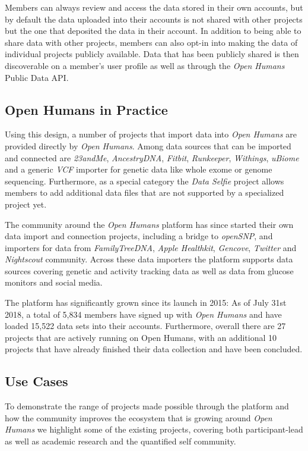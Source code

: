 \documentclass[a4paper,num-refs]{oup-contemporary}
\begin{document}
Members can always review and access the data stored in their own accounts, but by default the data uploaded into their accounts is not shared with other projects but the one that deposited the data in their account. In addition to being able to share data with other projects, members can also opt-in into making the data of individual projects publicly available. Data that has been publicly shared is then discoverable on a member's user profile as well as through the \textit{Open Humans} Public Data API. 

\subsection{Open Humans in Practice}
Using this design, a number of projects that import data into \textit{Open Humans} are provided directly by \textit{Open Humans}. Among data sources that can be imported and connected are \textit{23andMe}, \textit{AncestryDNA}, \textit{Fitbit}, \textit{Runkeeper}, \textit{Withings}, \textit{uBiome} and a generic \textit{VCF} importer for genetic data like whole exome or genome sequencing. Furthermore, as a special category the \textit{Data Selfie} project allows members to add additional data files that are not supported by a specialized project yet.

The community around the \textit{Open Humans} platform has since started their own data import and connection projects, including a bridge to \textit{openSNP}, and importers for data from \textit{FamilyTreeDNA}, \textit{Apple Healthkit}, \textit{Gencove}, \textit{Twitter} and \textit{Nightscout} community. Across these data importers the platform supports data sources covering genetic and activity tracking data as well as data from glucose monitors and social media.

The platform has significantly grown since its launch in 2015: As of July 31st 2018, a total of 5,834 members have signed up with \textit{Open Humans} and have loaded 15,522 data sets into their accounts. Furthermore, overall there are 27 projects that are actively running on Open Humans, with an additional 10 projects that have already finished their data collection and have been concluded.

\subsection{Use Cases}
To demonstrate the range of projects made possible through the platform and how the community improves the ecosystem that is growing around \textit{Open Humans} we highlight some of the existing projects, covering both participant-lead as well as academic research and the quantified self community.
\end{document}

